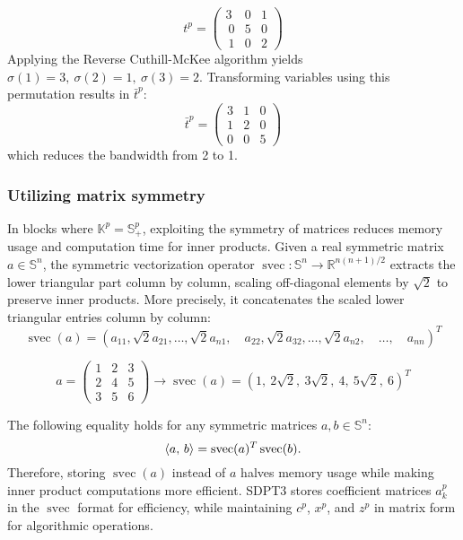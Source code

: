 \begin{example}
\[
    t^p = \begin{pmatrix}
        3 & 0 & 1 \\\
        0 & 5 & 0 \\\
        1 & 0 & 2
    \end{pmatrix}
\]
Applying the Reverse Cuthill-McKee algorithm yields $\sigma(1)=3, ~ \sigma(2)=1, ~ \sigma(3)=2$.
Transforming variables using this permutation results in $\bar{t}^p$:
\[
    \bar{t}^p = \begin{pmatrix}
        3 & 1 & 0 \\
        1 & 2 & 0 \\
        0 & 0 & 5
    \end{pmatrix}
\]
which reduces the bandwidth from 2 to 1.
\end{example}


\subsubsection{Utilizing matrix symmetry}
In blocks where $\mathbb{K}^p=\mathbb{S}_+^p$, exploiting the symmetry of matrices reduces memory usage and computation time for inner products.
Given a real symmetric matrix $a\in \mathbb{S}^n$, the symmetric vectorization operator $\operatorname{svec}: \mathbb{S}^n \rightarrow \mathbb{R}^{n(n+1)/2}$ extracts the lower triangular part column by column, scaling off-diagonal elements by $\sqrt{2}$ to preserve inner products.
More precisely, it concatenates the scaled lower triangular entries column by column:
\[ \operatorname{svec}(a) = (a_{11}, \sqrt{2}a_{21}, \ldots, \sqrt{2}a_{n1}, \quad a_{22}, \sqrt{2}a_{32}, \ldots, \sqrt{2}a_{n2}, \quad \ldots, \quad a_{nn})^T \]
\begin{example}
\[a = \begin{pmatrix}
    1 & 2 & 3\\
    2 & 4 & 5\\
    3 & 5 & 6
\end{pmatrix} \rightarrow \operatorname{svec}(a) = (1, ~ 2\sqrt{2}, ~ 3\sqrt{2}, ~ 4, ~ 5\sqrt{2}, ~ 6)^T\]
\end{example}

\medskip

The following equality holds for any symmetric matrices $a, b \in \mathbb{S}^n$:
\[\left\langle a, \, b \right\rangle = \operatorname{svec}(a)^T \operatorname{svec}(b).\]
Therefore, storing $\operatorname{svec}(a)$ instead of $a$ halves memory usage while making inner product computations more efficient.
SDPT3 stores coefficient matrices $a^p_k$ in the $\operatorname{svec}$ format for efficiency, while maintaining $c^p$, $x^p$, and $z^p$ in matrix form for algorithmic operations.


